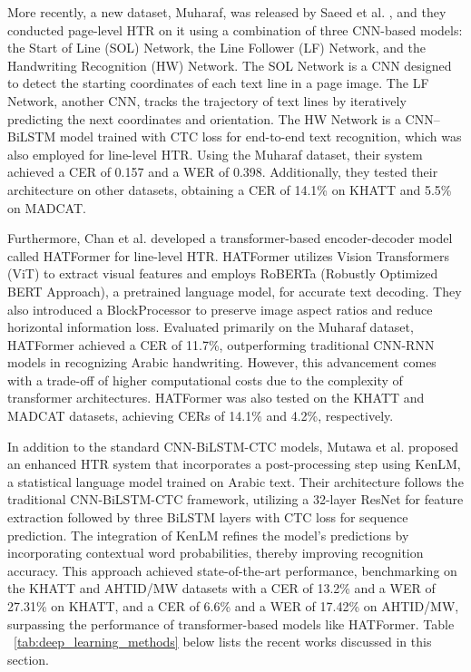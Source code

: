 \documentclass[conference]{IEEEtran}
\begin{document}
More recently, a new dataset, Muharaf, was released by  Saeed et al. \cite{saeed2024muharaf}, and they conducted page-level HTR on it using a combination of three CNN-based models: the Start of Line (SOL) Network, the Line Follower (LF) Network, and the Handwriting Recognition (HW) Network. The SOL Network is a CNN designed to detect the starting coordinates of each text line in a page image. The LF Network, another CNN, tracks the trajectory of text lines by iteratively predicting the next coordinates and orientation. The HW Network is a CNN–BiLSTM model trained with CTC loss for end-to-end text recognition, which was also employed for line-level HTR. Using the Muharaf dataset, their system achieved a CER of 0.157 and a WER of 0.398. Additionally, they tested their architecture on other datasets, obtaining a CER of 14.1\% on KHATT and 5.5\% on MADCAT.

Furthermore, Chan et al. \cite{chan2024hatformer} developed a transformer-based encoder-decoder model called HATFormer for line-level HTR. HATFormer utilizes Vision Transformers (ViT) \cite{ViT}to extract visual features and employs RoBERTa (Robustly Optimized BERT Approach), a pretrained language model, for accurate text decoding. They also introduced a BlockProcessor to preserve image aspect ratios and reduce horizontal information loss. Evaluated primarily on the Muharaf dataset, HATFormer achieved a CER of 11.7\%, outperforming traditional CNN-RNN models in recognizing Arabic handwriting. However, this advancement comes with a trade-off of higher computational costs due to the complexity of transformer architectures. HATFormer was also tested on the KHATT and MADCAT datasets, achieving CERs of 14.1\% and 4.2\%, respectively.

In addition to the standard CNN-BiLSTM-CTC models, Mutawa et al. \cite{mutawa2024machine} proposed an enhanced HTR system that incorporates a post-processing step using KenLM, a statistical language model trained on Arabic text. Their architecture follows the traditional CNN-BiLSTM-CTC framework, utilizing a 32-layer ResNet for feature extraction followed by three BiLSTM layers with CTC loss for sequence prediction. The integration of KenLM refines the model's predictions by incorporating contextual word probabilities, thereby improving recognition accuracy. This approach achieved state-of-the-art performance, benchmarking on the KHATT and AHTID/MW datasets with a CER of 13.2\% and a WER of 27.31\% on KHATT, and a CER of 6.6\% and a WER of 17.42\% on AHTID/MW, surpassing the performance of transformer-based models like HATFormer. Table ~\ref{tab:deep_learning_methods} below lists the recent works discussed in this section.
\end{document}

